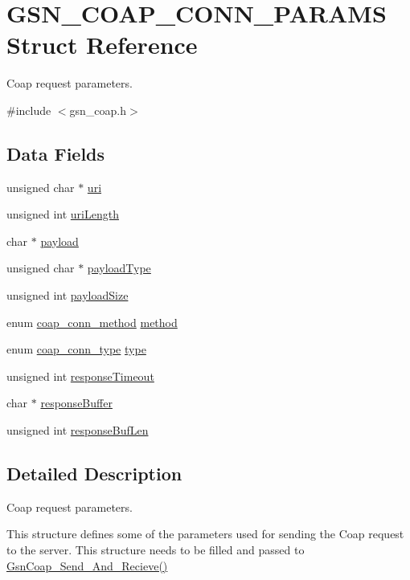 \hypertarget{a00040}{
\section{GSN\_\-COAP\_\-CONN\_\-PARAMS Struct Reference}
\label{a00040}
}


Coap request parameters.  




{\ttfamily \#include $<$gsn\_\-coap.h$>$}

\subsection*{Data Fields}
\begin{DoxyCompactItemize}
\item 
unsigned char $\ast$ \hyperlink{a00040_af2c03b6965ce2fbbb29b97a2818c96a2}{uri}
\item 
unsigned int \hyperlink{a00040_ac9014e89602db993be93ac49af0826c2}{uriLength}
\item 
char $\ast$ \hyperlink{a00040_a18f141cb2726073503afb9f1d6c85efb}{payload}
\item 
unsigned char $\ast$ \hyperlink{a00040_a11d323097991f661a8433d7a8de8d401}{payloadType}
\item 
unsigned int \hyperlink{a00040_aaeb932b3bf79799bf0ee8a418682d486}{payloadSize}
\item 
enum \hyperlink{a00538_a60b3db981099ef05a78fd3a008890d4a}{coap\_\-conn\_\-method} \hyperlink{a00040_a082b4f8f68989edcecc0e9f24f219b12}{method}
\item 
enum \hyperlink{a00538_a4d3cbe1c9f1d4b500c83635a57a37d94}{coap\_\-conn\_\-type} \hyperlink{a00040_a0732b6df1426f35ef3677a29fbdb5786}{type}
\item 
unsigned int \hyperlink{a00040_ac927f3777727f3e6531ce7ddbd12c405}{responseTimeout}
\item 
char $\ast$ \hyperlink{a00040_aeb021c3121e95e8f02b5b3e2c856636a}{responseBuffer}
\item 
unsigned int \hyperlink{a00040_afd3ab8c211af1d9d40ede0157631dbb2}{responseBufLen}
\end{DoxyCompactItemize}


\subsection{Detailed Description}
Coap request parameters. 

This structure defines some of the parameters used for sending the Coap request to the server. This structure needs to be filled and passed to \hyperlink{a00478_ae817954f9719fe38e7f16d85984c6667}{GsnCoap\_\-Send\_\-And\_\-Recieve()} 

